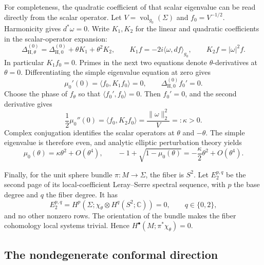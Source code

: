 \documentclass[11pt,letterpaper,reqno]{amsart}
\theoremstyle{remark}
\begin{document}
For completeness, the quadratic coefficient of that scalar eigenvalue
can be read directly from the scalar operator. Let
$V=\operatorname{vol}_{g_0}(\Sigma)$ and $f_0=V^{-1/2}$. Harmonicity
gives $d^*\omega=0$. Write $K_1,K_2$ for the linear and quadratic
coefficients in the scalar-operator expansion:
\begin{equation}\label{app:scalarexpansion}
 \Delta_{\mathrm H,\theta}^{(0)}
 =\Delta_{\mathrm H,0}^{(0)}+\theta K_1+\theta^2K_2,
 \qquad
 K_1f=-2i\langle\omega,df\rangle_{g_0},\qquad
 K_2f=|\omega|^2f.
\end{equation}
In particular $K_1f_0=0$. Primes in the next two equations denote
$\theta$-derivatives at $\theta=0$. Differentiating the simple eigenvalue
equation at zero gives
\begin{equation}\label{app:scalarfirstderivative}
 \mu_0'(0)=\langle f_0,K_1f_0\rangle=0,
 \qquad
 \Delta_{\mathrm H,0}^{(0)}f_0'=0.
\end{equation}
Choose the phase of $f_\theta$ so that $\langle f_0',f_0\rangle=0$.
Then $f_0'=0$, and the second derivative gives
\begin{equation}\label{app:scalarsecondderivative}
 \frac12\mu_0''(0)=\langle f_0,K_2f_0\rangle
 =\frac{\|\omega\|_2^2}{V}=:\kappa>0.
\end{equation}
Complex conjugation identifies the scalar operators at $\theta$ and
$-\theta$. The simple eigenvalue is therefore even, and analytic
elliptic perturbation theory yields
\begin{equation}\label{app:scalarquadratic}
 \mu_0(\theta)=\kappa\theta^2+O(\theta^4),\qquad
 -1+\sqrt{1-\mu_0(\theta)}
 =-\frac{\kappa}{2}\theta^2+O(\theta^4).
\end{equation}

Finally, for the unit sphere bundle $\pi:M\to\Sigma$, the fiber is
$S^2$. Let $E_2^{p,q}$ be the second page of its local-coefficient
Leray--Serre spectral sequence, with $p$ the base degree and $q$ the
fiber degree. It has
\begin{equation}\label{app:spherepullback}
 E_2^{p,q}
 =H^p(\Sigma;\chi_\theta\otimes H^q(S^2;\mathbb C))
 =0,
 \qquad q\in\{0,2\},
\end{equation}
and no other nonzero rows. The orientation of the bundle makes the
fiber cohomology local systems trivial. Hence
$H^\bullet(M;\pi^*\chi_\theta)=0$.

\subsection{The nondegenerate conformal direction}\label{app:conformal}
\end{document}
